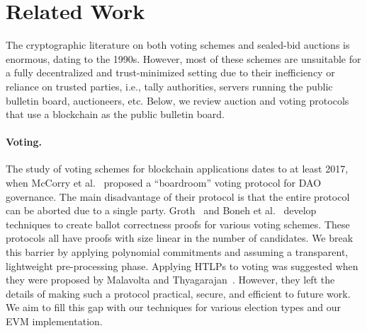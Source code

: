 \section{Related Work}

The cryptographic literature on both voting schemes and sealed-bid auctions is enormous, dating to the 1990s. However, most of these schemes are unsuitable for a fully decentralized and trust-minimized setting due to their inefficiency or reliance on trusted parties, i.e., tally authorities, servers running the public bulletin board, auctioneers, etc. Below, we review auction and voting protocols that use a blockchain as the public bulletin board. 

\paragraph{Voting.} 
The study of voting schemes for blockchain applications dates to at least 2017, when McCorry et al.~\cite{FC:McCShaHao17} proposed a ``boardroom'' voting protocol for DAO governance.
The main disadvantage of their protocol is that the entire protocol can be aborted due to a single party. Groth~\cite{ACNS:Groth05} and Boneh et al.~\cite{C:BBCGI23} develop techniques to create ballot correctness proofs for various voting schemes. These protocols all have proofs with size linear in the number of candidates. We break this barrier by applying polynomial commitments and assuming a transparent, lightweight pre-processing phase. Applying HTLPs to voting was suggested when they were proposed by Malavolta and Thyagarajan~\cite{C:MalThy19}. However, they left the details of making such a protocol practical, secure, and efficient to future work. We aim to fill this gap with our techniques for various election types and our EVM implementation.

